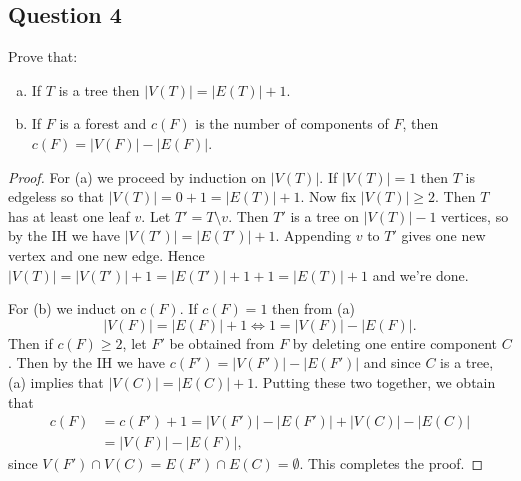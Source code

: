 \subsection{Question 4} Prove that:
\begin{enumerate}[(a), leftmargin=1cm]
	\item If \( T \) is a tree then \( |V(T)| = |E(T)| + 1 \).
	\item If \( F \) is a forest and \( c(F) \) is the number of components of \( F \), then \( c(F) = |V(F)| - |E(F)| \).
\end{enumerate}
\begin{proof}
For (a) we proceed by induction on \( |V(T)| \). If \( |V(T)| = 1 \) then \( T \) is edgeless so that \( |V(T)| = 0 + 1 = |E(T)| + 1 \). Now fix \( |V(T)| \geq 2 \).  Then \( T \) has at least one leaf \( v \). Let \( T' = T \setminus v \). Then \( T' \) is a tree on \( |V(T)| - 1 \) vertices, so by the IH we have \( |V(T')| = |E(T')| + 1 \). Appending \( v \) to \( T' \) gives one new vertex and one new edge. Hence \( |V(T)| = |V(T')| + 1 = |E(T')| + 1 + 1 = |E(T)| + 1 \) and we're done.

For (b) we induct on \( c(F) \). If \( c(F) = 1 \) then from (a) \[|V(F)| = |E(F)| + 1 \Leftrightarrow   1 = |V(F)| - |E(F)|. \] Then if \( c(F) \geq 2 \), let \( F' \) be obtained from \( F \) by deleting one entire component \( C \). Then by the IH we have \( c(F') = |V(F')| - |E(F')| \) and since \( C \) is a tree, (a) implies that \( |V(C)| = |E(C)| + 1  \). Putting these two together, we obtain that
\begin{align*}
	c(F) &= c(F') + 1 = |V(F')| - |E(F')| + |V(C)| - |E(C)| \\
	     &= |V(F)| - |E(F)|, 
\end{align*}
since \( V(F') \cap V(C) = E(F') \cap E(C) = \emptyset  \). This completes the proof. 
\end{proof}

